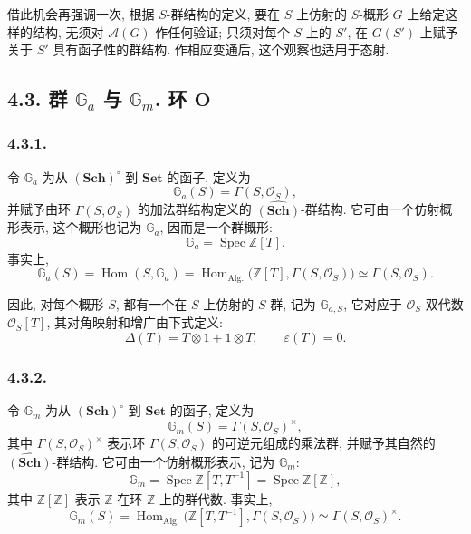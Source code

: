 借此机会再强调一次, 根据 \(S\)-群结构的定义, 要在 \(S\) 上仿射的
\(S\)-概形 \(G\) 上给定这样的结构, 无须对 \(\mathscr A(G)\) 作任何验证;
只须对每个 \(S\) 上的 \(S'\), 在 \(G(S')\) 上赋予关于 \(S'\)
具有函子性的群结构. 作相应变通后, 这个观察也适用于态射.

\subsection*{4.3. 群 \(\mathbb G_a\) 与 \(\mathbb G_m\). 环
\(\mathbf O\)}

\subsubsection*{4.3.1.}

令 \(\mathbb G_a\) 为从 \((\mathbf{Sch})^{\circ}\) 到
\(\mathbf{Set}\) 的函子, 定义为
\[
  \mathbb G_a(S)=\Gamma(S,\mathcal O_S),
\]
并赋予由环 \(\Gamma(S,\mathcal O_S)\) 的加法群结构定义的
\(\widehat{(\mathbf{Sch})}\)-群结构. 它可由一个仿射概形表示,
这个概形也记为 \(\mathbb G_a\), 因而是一个群概形:
\[
  \mathbb G_a=\operatorname{Spec}\mathbb Z[T].
\]
事实上,
\[
  \mathbb G_a(S)
    =\operatorname{Hom}(S,\mathbb G_a)
    =\operatorname{Hom}_{\mathrm{Alg.}}
       \bigl(\mathbb Z[T],\Gamma(S,\mathcal O_S)\bigr)
    \simeq\Gamma(S,\mathcal O_S).
\]

因此, 对每个概形 \(S\), 都有一个在 \(S\) 上仿射的 \(S\)-群,
记为 \(\mathbb G_{a,S}\), 它对应于 \(\mathcal O_S\)-双代数
\(\mathcal O_S[T]\), 其对角映射和增广由下式定义:
\[
  \Delta(T)=T\otimes1+1\otimes T,
  \qquad
  \varepsilon(T)=0.
\]

\subsubsection*{4.3.2.}

令 \(\mathbb G_m\) 为从 \((\mathbf{Sch})^{\circ}\) 到
\(\mathbf{Set}\) 的函子, 定义为
\[
  \mathbb G_m(S)=\Gamma(S,\mathcal O_S)^{\times},
\]
其中 \(\Gamma(S,\mathcal O_S)^{\times}\) 表示环 \(\Gamma(S,\mathcal O_S)\)
的可逆元组成的乘法群, 并赋予其自然的 \(\widehat{(\mathbf{Sch})}\)-群结构.
它可由一个仿射概形表示, 记为 \(\mathbb G_m\):
\[
  \mathbb G_m
    =\operatorname{Spec}\mathbb Z[T,T^{-1}]
    =\operatorname{Spec}\mathbb Z[\mathbb Z],
\]
其中 \(\mathbb Z[\mathbb Z]\) 表示 \(\mathbb Z\) 在环 \(\mathbb Z\)
上的群代数. 事实上,
\[
  \mathbb G_m(S)
    =\operatorname{Hom}_{\mathrm{Alg.}}
       \bigl(\mathbb Z[T,T^{-1}],\Gamma(S,\mathcal O_S)\bigr)
    \simeq\Gamma(S,\mathcal O_S)^{\times}.
\]

